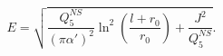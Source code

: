 \begin{equation}
E = \sqrt{\frac{Q_5^{NS}}{(\pi\alpha')^2}\ln^2\left( 
\frac{l + r_0}{r_0}\right) + \frac{J^2}{Q_5^{NS}} }.
\label{dis}\end{equation}

